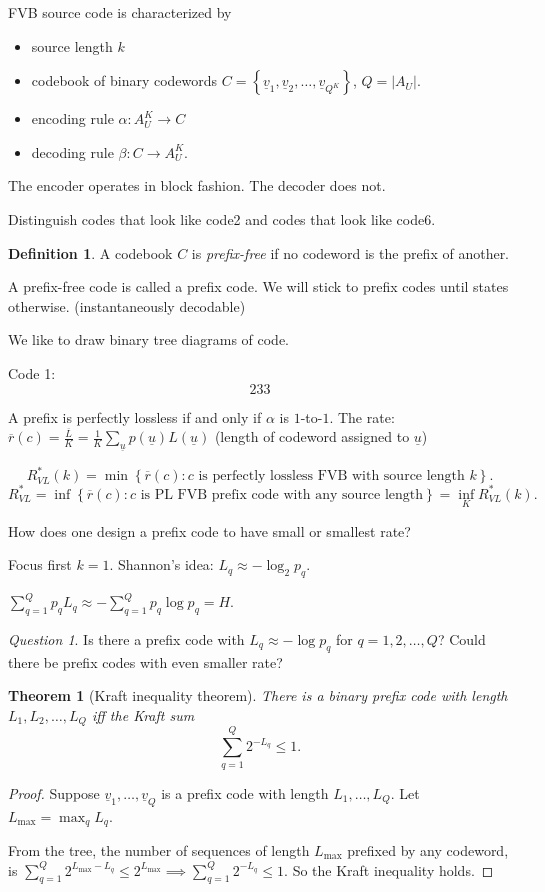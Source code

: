 \documentclass{report}
\newcommand{\set}[1]{\left\lbrace #1 \right\rbrace}
\newtheorem{theorem}{Theorem}[section]
\theoremstyle{definition}
\newtheorem{definition}{Definition}[section]
\theoremstyle{remark}
\newtheorem*{question}{Question}
\numberwithin{equation}{section}
\begin{document}
FVB source code is characterized by \begin{itemize}
  \item source length $k$
  \item codebook of binary codewords $C = \set{\underline{v}_1, \underline{v}_2, \ldots, \underline{v}_{Q^K}}$, $Q = |A_U|$.
  \item encoding rule $\alpha: A_U^K \to C$
  \item decoding rule $\beta: C \to A_U^K$.
\end{itemize}

The encoder operates in block fashion. The decoder does not.

Distinguish codes that look like code2 and codes that look like code6.

\begin{definition}
  A codebook $C$ is \emph{prefix-free} if no codeword is the prefix of another. 
\end{definition}
A prefix-free code is called a prefix code. We will stick to prefix codes until states otherwise.
(instantaneously decodable)

We like to draw binary tree diagrams of code.

Code 1: \[
  233
\]

A prefix is perfectly lossless if and only if $\alpha$ is $1$-to-$1$.
The rate: $\overline{r}(c) = \frac{\overline{L}}{K} = \frac{1}{K}\sum_{\underline{u}}p(\underline{u})L(\underline{u})$ (length of codeword assigned to $\underline{u}$)

\[
  R^*_{VL}(k) = \min \set{\overline{r}(c): c \text{ is perfectly lossless FVB with source length $k$}}.
\]
\[
  R^*_{VL} = \inf \set{\overline{r}(c): c \text{ is PL FVB prefix code with any source length}} = \inf_K R^*_{VL}(k).
\]

How does one design a prefix code to have small or smallest rate?

Focus first $k = 1$. Shannon's idea: $L_q \approx -\log_2 p_q$.

$\sum_{q=1}^Q p_q L_q \approx -\sum_{q=1}^Q p_q \log p_q = H$.

\begin{question}
  Is there a prefix code with $L_q \approx -\log p_q$ for $q = 1, 2, \ldots, Q$? Could there be prefix codes with even smaller rate?
\end{question}

\begin{theorem}[Kraft inequality theorem]
  There is a binary prefix code with length $L_1, L_2, \ldots, L_Q$ iff the Kraft sum \[\sum_{q=1}^Q 2^{-L_q} \leq 1.\]
\end{theorem}
\begin{proof}
  Suppose $\underline{v}_1, \ldots, \underline{v}_Q$ is a prefix code with length $L_1, \ldots, L_Q$. Let $L_{\max} = \max_q L_q$.

  From the tree, the number of sequences of length $L_{\max}$ prefixed by any codeword, is $\sum_{q=1}^Q 2^{L_{\max} - L_q} \leq 2^{L_{\max}} \implies \sum_{q=1}^Q 2^{-L_q} \leq 1$. So the Kraft inequality holds.
\end{proof}
\end{document}

